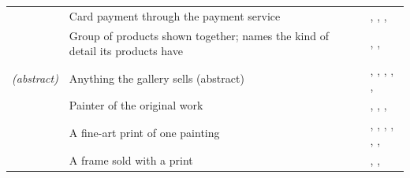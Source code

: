 \begin{longtable}{@{}P{2.6cm}P{5.2cm}P{7.2cm}@{}}
\small {} & \small Card payment through the payment service & \small {}, , , \\
\small {} & \small Group of products shown together; names the kind of detail its products have & \small {}, , \\
\small {} \emph{(abstract)} & \small Anything the gallery sells (abstract) & \small {}, , , , , \\
\small {} & \small Painter of the original work & \small {}, , , \\
\small {} & \small A fine-art print of one painting & \small {}, , , , , , \\
\small {} & \small A frame sold with a print & \small {}, , \\
\end{longtable}
